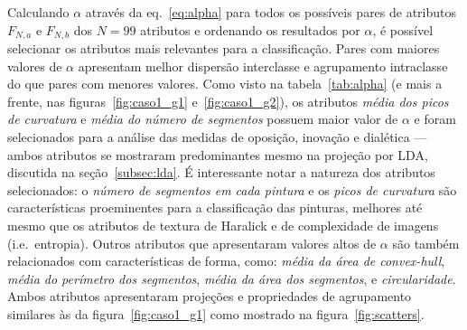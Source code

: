 Calculando $\alpha$ através da eq.~\ref{eq:alpha} para todos os
possíveis pares de atributos $F_{N, a}$ e $F_{N, b}$ dos $N = 99$
atributos e ordenando os resultados por $\alpha$, é possível
selecionar os atributos mais relevantes para a classificação.
Pares com maiores valores de $\alpha$ apresentam melhor dispersão
interclasse e agrupamento intraclasse do que pares com menores
valores. Como visto na tabela~\ref{tab:alpha} (e mais a frente, nas
figuras~\ref{fig:caso1_g1} e~\ref{fig:caso1_g2}), os atributos
\emph{média dos picos de curvatura} e \emph{média do número de
  segmentos} possuem maior valor de $\alpha$ e foram selecionados para
a análise das medidas de oposição, inovação e dialética --- ambos
atributos se mostraram predominantes mesmo na projeção por LDA,
discutida na seção~\ref{subsec:lda}. É interessante notar a natureza
dos atributos selecionados: o \textit{número de segmentos em cada pintura} e os
\textit{picos de curvatura} são características proeminentes para a
classificação das pinturas, melhores até mesmo que os atributos de
textura de Haralick e de complexidade de imagens (i.e.\
entropia). Outros atributos que apresentaram valores altos de $\alpha$
são também relacionados com características de forma, como:
\textit{média da área de convex-hull}, \textit{média do perímetro dos segmentos}, \textit{média da área dos segmentos}, e \textit{circularidade}. Ambos atributos apresentaram projeções e
propriedades de agrupamento similares às da figura~\ref{fig:caso1_g1}
como mostrado na figura~\ref{fig:scatters}.
 
